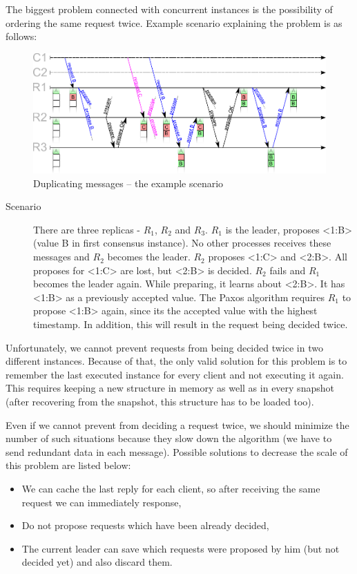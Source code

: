 The biggest problem connected with concurrent instances is the possibility of ordering the same request twice. Example scenario explaining the problem is as follows:
\begin{figure}[ht]
  \includegraphics[keepaspectratio, width=\textwidth]{paxos/duplicating_messages.pdf}
  \caption{Duplicating messages -- the example scenario}
\end{figure}
\begin{description}
  \item[Scenario] There are three replicas - $R_1$, $R_2$ and $R_3$. $R_1$ is the leader, proposes <1:B> (value B in first consensus instance). No other processes receives these messages and $R_2$ becomes the leader. $R_2$ proposes <1:C> and <2:B>. All proposes for <1:C> are lost, but <2:B> is decided. $R_2$ fails and $R_1$ becomes the leader again. While preparing, it learns about <2:B>. It has <1:B> as a previously accepted value. The Paxos algorithm requires $R_1$ to propose <1:B> again, since its the accepted value with the highest timestamp. In addition, this will result in the request being decided twice.
\end{description}

Unfortunately, we cannot prevent requests from being decided twice in two different instances. Because of that, the only valid solution for this problem is to remember the last executed instance for every client and not executing it again. This requires keeping a new structure in memory as well as in every snapshot (after recovering from the snapshot, this structure has to be loaded too).

Even if we cannot prevent from deciding a request twice, we should minimize the number of such situations because they slow down the algorithm (we have to send redundant data in each message). Possible solutions to decrease the scale of this problem are listed below:
\begin{itemize}
  \item We can cache the last reply for each client, so after receiving the same request we can immediately response,
  \item Do not propose requests which have been already decided,
  \item The current leader can save which requests were proposed by him (but not decided yet) and also discard them.
\end{itemize}

